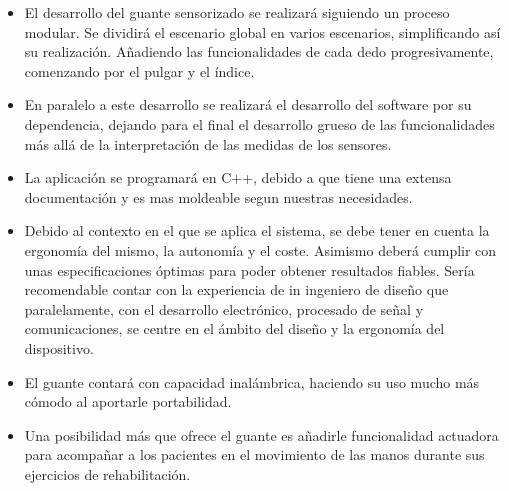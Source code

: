 \begin{itemize}
	\item El desarrollo del guante sensorizado se realizará siguiendo un proceso modular. Se dividirá el escenario global en varios escenarios, simplificando así su realización. Añadiendo las funcionalidades de cada dedo progresivamente, comenzando por el pulgar y el índice. 
	 
	\item En paralelo a este desarrollo se realizará el desarrollo del software por su dependencia, dejando para el final el desarrollo grueso de las funcionalidades más allá de la interpretación de las medidas de los sensores. 
	
	 
	\item La aplicación se programará en C++, debido a que tiene una extensa documentación y es mas moldeable segun nuestras necesidades.
	
	\item Debido al contexto en el que se aplica el sistema, se debe tener en cuenta la ergonomía del mismo, la autonomía y el coste.
	Asimismo deberá cumplir con unas especificaciones óptimas para poder obtener resultados fiables. Sería recomendable contar con la experiencia de in ingeniero de diseño que paralelamente, con el desarrollo electrónico, procesado de señal y comunicaciones, se centre en el ámbito del diseño y la ergonomía del dispositivo.
	
	
	
	\item El guante contará con capacidad inalámbrica, haciendo su uso mucho más cómodo al aportarle portabilidad.
	
	\item Una posibilidad más que ofrece el guante es añadirle funcionalidad actuadora para acompañar a los pacientes en el movimiento de las manos durante sus ejercicios de rehabilitación. 
\end{itemize}